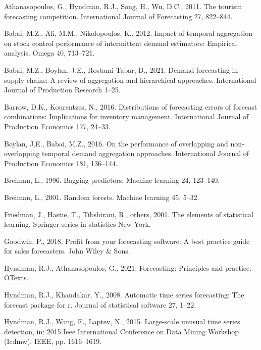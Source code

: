 \documentclass[]{elsarticle} %
\begin{document}
\leavevmode\hypertarget{ref-athanasopoulos2011tourism}{}%
Athanasopoulos, G., Hyndman, R.J., Song, H., Wu, D.C., 2011. The tourism
forecasting competition. International Journal of Forecasting 27,
822--844.

\leavevmode\hypertarget{ref-babai2012impact}{}%
Babai, M.Z., Ali, M.M., Nikolopoulos, K., 2012. Impact of temporal
aggregation on stock control performance of intermittent demand
estimators: Empirical analysis. Omega 40, 713--721.

\leavevmode\hypertarget{ref-babai2021demand}{}%
Babai, M.Z., Boylan, J.E., Rostami-Tabar, B., 2021. Demand forecasting
in supply chains: A review of aggregation and hierarchical approaches.
International Journal of Production Research 1--25.

\leavevmode\hypertarget{ref-barrow2016distributions}{}%
Barrow, D.K., Kourentzes, N., 2016. Distributions of forecasting errors
of forecast combinations: Implications for inventory management.
International Journal of Production Economics 177, 24--33.

\leavevmode\hypertarget{ref-boylan2016performance}{}%
Boylan, J.E., Babai, M.Z., 2016. On the performance of overlapping and
non-overlapping temporal demand aggregation approaches. International
Journal of Production Economics 181, 136--144.

\leavevmode\hypertarget{ref-breiman1996bagging}{}%
Breiman, L., 1996. Bagging predictors. Machine learning 24, 123--140.

\leavevmode\hypertarget{ref-breiman2001random}{}%
Breiman, L., 2001. Random forests. Machine learning 45, 5--32.

\leavevmode\hypertarget{ref-friedman2001elements}{}%
Friedman, J., Hastie, T., Tibshirani, R., others, 2001. The elements of
statistical learning. Springer series in statistics New York.

\leavevmode\hypertarget{ref-goodwin2018profit}{}%
Goodwin, P., 2018. Profit from your forecasting software: A best
practice guide for sales forecasters. John Wiley \& Sons.

\leavevmode\hypertarget{ref-hyndman2021forecasting}{}%
Hyndman, R.J., Athanasopoulos, G., 2021. Forecasting: Principles and
practice. OTexts.

\leavevmode\hypertarget{ref-hyndman2008automatic}{}%
Hyndman, R.J., Khandakar, Y., 2008. Automatic time series forecasting:
The forecast package for r. Journal of statistical software 27, 1--22.

\leavevmode\hypertarget{ref-hyndman2015large}{}%
Hyndman, R.J., Wang, E., Laptev, N., 2015. Large-scale unusual time
series detection, in: 2015 Ieee International Conference on Data Mining
Workshop (Icdmw). IEEE, pp. 1616--1619.
\end{document}
